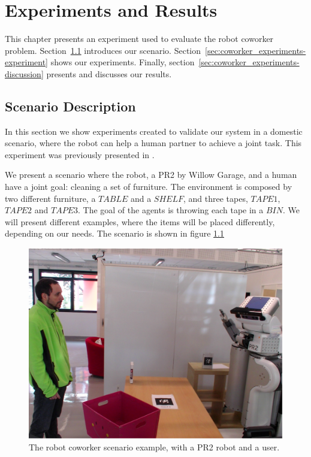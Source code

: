 \chapter{Experiments and Results} %

\label{chapter:coworker_experiments} %


This chapter presents an experiment used to evaluate the robot coworker problem. Section~\ref{sec:coworker_experiments-scenario} introduces our scenario. Section~\ref{sec:coworker_experiments-experiment} shows our experiments. Finally, section~\ref{sec:coworker_experiments-discussion} presents and discusses our results.


\section{Scenario Description}
\label{sec:coworker_experiments-scenario}
In this section we show experiments created to validate our system in a domestic scenario, where the robot can help a human partner to achieve a joint task. This experiment was previously presented in \cite{fioreiser2014}.


We present a scenario where the robot, a PR2 by Willow Garage, and a human have a joint goal: cleaning a set of furniture. 
The environment is composed by two different furniture, a $TABLE$ and a $SHELF$, and three tapes,
 $TAPE1$, $TAPE2$ and $TAPE3$. The goal of the agents is throwing each tape in a $BIN$. We will present different examples, where the items will be placed differently, depending on our needs. The scenario is shown in figure \ref{fig:coworker_results-pr2helper}

 \begin{figure}[ht!]
 	\centering
 	\includegraphics[scale=0.45]{img/coworker/results/experiment.pdf}
 	\caption{The robot coworker scenario example, with a PR2 robot and a user.}
 	\label{fig:coworker_results-pr2helper}
 \end{figure}

